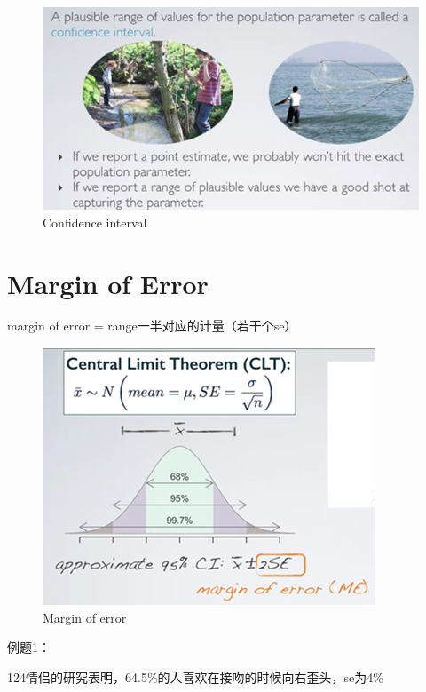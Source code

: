 \documentclass[]{book}
\begin{document}
\begin{figure}

{\centering \includegraphics[width=0.8\linewidth]{graphs/2-3} 

}

\caption{Confidence interval}\label{fig:fig2-1}
\end{figure}

\section{Margin of Error}\label{margin-of-error}

margin of error = range一半对应的计量（若干个se）

\begin{figure}

{\centering \includegraphics[width=0.8\linewidth]{graphs/2-4} 

}

\caption{Margin of error}\label{fig:fig2-4}
\end{figure}

例题1：

124情侣的研究表明，64.5\%的人喜欢在接吻的时候向右歪头，se为4\%
\end{document}
